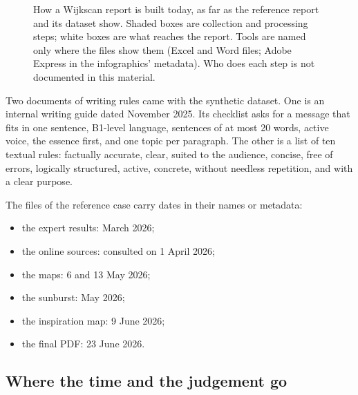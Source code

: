 \begin{figure}[ht]
\caption{How a Wijkscan report is built today, as far as the reference report and its dataset show. Shaded boxes are collection and processing steps; white boxes are what reaches the report. Tools are named only where the files show them (Excel and Word files; Adobe Express in the infographics' metadata). Who does each step is not documented in this material.}\label{fig:process}
\end{figure}

Two documents of writing rules came with the synthetic dataset. One is an internal writing guide dated November 2025. Its checklist asks for a message that fits in one sentence, B1-level language, sentences of at most 20 words, active voice, the essence first, and one topic per paragraph. The other is a list of ten textual rules: factually accurate, clear, suited to the audience, concise, free of errors, logically structured, active, concrete, without needless repetition, and with a clear purpose.

The files of the reference case carry dates in their names or metadata:
\begin{itemize}
\item the expert results: March 2026;
\item the online sources: consulted on 1 April 2026;
\item the maps: 6 and 13 May 2026;
\item the sunburst: May 2026;
\item the inspiration map: 9 June 2026;
\item the final PDF: 23 June 2026.
\end{itemize}

\subsection{Where the time and the judgement go}\label{sec:process-effort}

